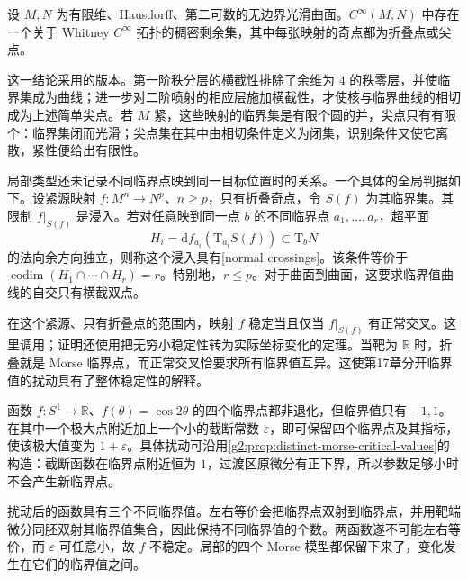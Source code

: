 \begin{theorem}[曲面映射的一般位置]\label{g2:thm:generic-surface-singularities}
	设 \(M,N\) 为有限维、Hausdorff、第二可数的无边界光滑曲面。\(C^\infty(M,N)\) 中存在一个关于 Whitney \(C^\infty\) 拓扑的稠密剩余集，其中每张映射的奇点都为折叠点或尖点。
\end{theorem}

这一结论采用\cite[第VI章定理2.5及第4节]{GolubitskyGuillemin1973}的版本。第一阶秩分层的横截性排除了余维为 \(4\) 的秩零层，并使临界集成为曲线；进一步对二阶喷射的相应层施加横截性，才使核与临界曲线的相切成为上述简单尖点。若 \(M\) 紧，这些映射的临界集是有限个圆的并，尖点只有有限个：临界集闭而光滑；尖点集在其中由相切条件定义为闭集，识别条件又使它离散，紧性便给出有限性。

\ProseParagraphBreak

局部类型还未记录不同临界点映到同一目标位置时的关系。一个具体的全局判据如下。设紧源映射 \(f:M^n\to N^p\)、\(n\ge p\)，只有折叠奇点，令 \(S(f)\) 为其临界集。其限制 \(f|_{S(f)}\) 是浸入。若对任意映到同一点 \(b\) 的不同临界点 \(a_1,\ldots,a_r\)，超平面
\[
	H_i=\mathrm df_{a_i}(\mathrm T_{a_i}S(f))\subset\mathrm T_bN
\]
的法向余方向独立，则称这个浸入具有[normal crossings]。该条件等价于 \(\operatorname{codim}(H_1\cap\cdots\cap H_r)=r\)。特别地，\(r\le p\)。对于曲面到曲面，这要求临界值曲线的自交只有横截双点。

\ProseParagraphBreak

在这个紧源、只有折叠点的范围内，映射 \(f\) 稳定当且仅当 \(f|_{S(f)}\) 有正常交叉。这里调用\cite[第III章定理4.4，结合第1节定理1.5]{GolubitskyGuillemin1973}；证明还使用把无穷小稳定性转为实际坐标变化的定理。当靶为 \(\mathbb R\) 时，折叠就是 Morse 临界点，而正常交叉恰要求所有临界值互异。这使第17章分开临界值的扰动具有了整体稳定性的解释。

\begin{example}\label{g2:exm:morse-equal-values-unstable}
	函数 \(f:S^1\to\mathbb R\)、\(f(\theta)=\cos2\theta\) 的四个临界点都非退化，但临界值只有 \(-1,1\)。在其中一个极大点附近加上一个小的截断常数 \(\varepsilon\)，即可保留四个临界点及其指标，使该极大值变为 \(1+\varepsilon\)。具体扰动可沿用\cref{g2:prop:distinct-morse-critical-values}的构造：截断函数在临界点附近恒为 \(1\)，过渡区原微分有正下界，所以参数足够小时不会产生新临界点。

	扰动后的函数具有三个不同临界值。左右等价会把临界点双射到临界点，并用靶端微分同胚双射其临界值集合，因此保持不同临界值的个数。两函数遂不可能左右等价，而 \(\varepsilon\) 可任意小，故 \(f\) 不稳定。局部的四个 Morse 模型都保留下来了，变化发生在它们的临界值之间。
\end{example}

